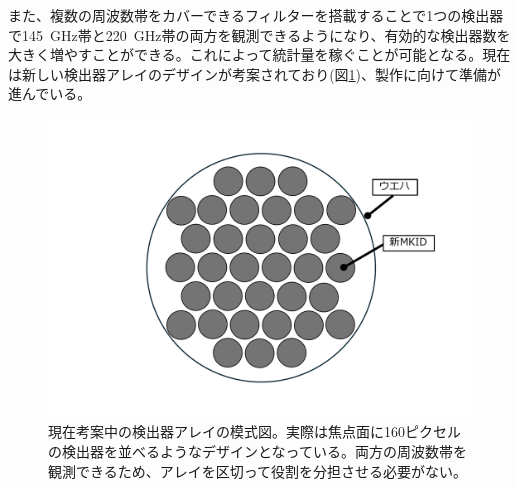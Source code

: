また、複数の周波数帯をカバーできるフィルターを搭載することで1つの検出器で\SI{145}{GHz}帯と\SI{220}{GHz}帯の両方を観測できるようになり、有効的な検出器数を大きく増やすことができる。これによって統計量を稼ぐことが可能となる。現在は新しい検出器アレイのデザインが考案されており(図\ref{new_kid})、製作に向けて準備が進んでいる。
\begin{figure}[htbp]
  \centering
  \includegraphics[width=0.75\columnwidth]{6_prospect/figs/new_kid.pdf}
  \caption{現在考案中の検出器アレイの模式図。実際は焦点面に160ピクセルの検出器を並べるようなデザインとなっている。両方の周波数帯を観測できるため、アレイを区切って役割を分担させる必要がない。}
  \label{new_kid}
\end{figure}



